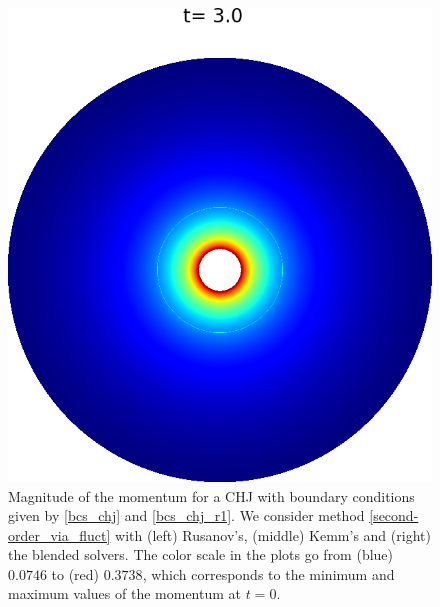 \documentclass[preprint, 11pt]{article}
\begin{document}
\begin{figure}[!h]
  \includegraphics[scale=0.28]{figures/chj_r1_blended_p3.png} \quad
  \caption{Magnitude of the momentum for a CHJ with boundary conditions given by
    \eqref{bcs_chj} and \eqref{bcs_chj_r1}. 
    We consider method \eqref{second-order_via_fluct} with (left) Rusanov's,
    (middle) Kemm's and (right) the blended solvers. 
    The color scale in the plots go from (blue) $0.0746$ to (red) $0.3738$,
    which corresponds to the minimum and maximum values of the momentum at $t=0$.
    \label{fig:chj_r1_diff}}
\end{figure}
\end{document}
